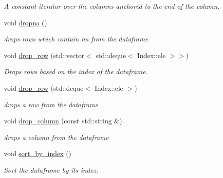 \begin{DoxyCompactItemize}
\begin{DoxyCompactList}\small\item\em A constant iterator over the columns anchored to the end of the column. \end{DoxyCompactList}\item 
void \hyperlink{classDataFrame_a6abc672ac4c439e3e785bd3f84c8da15}{dropna} ()
\begin{DoxyCompactList}\small\item\em drops rows which contain na from the dataframe \end{DoxyCompactList}\item 
void \hyperlink{classDataFrame_a4b4198c63e6ed421968303e872beb807}{drop\+\_\+row} (std\+::vector$<$ std\+::deque$<$ Index\+::ele $>$$>$)
\begin{DoxyCompactList}\small\item\em Drops rows based on the index of the dataframe. \end{DoxyCompactList}\item 
\mbox{\label{classDataFrame_a644965d62c039b88a940c2cb83a29fbc}} 
void \hyperlink{classDataFrame_a644965d62c039b88a940c2cb83a29fbc}{drop\+\_\+row} (std\+::deque$<$ Index\+::ele $>$)
\begin{DoxyCompactList}\small\item\em drops a row from the dataframe \end{DoxyCompactList}\item 
\mbox{\label{classDataFrame_afa6fd73a62f0d45b03e5df738a575693}} 
void \hyperlink{classDataFrame_afa6fd73a62f0d45b03e5df738a575693}{drop\+\_\+column} (const std\+::string \&)
\begin{DoxyCompactList}\small\item\em drops a column from the dataframe \end{DoxyCompactList}\item 
\mbox{\label{classDataFrame_ae9eb64b2d0c072459f85a4b840978060}} 
void \hyperlink{classDataFrame_ae9eb64b2d0c072459f85a4b840978060}{sort\+\_\+by\+\_\+index} ()
\begin{DoxyCompactList}\small\item\em Sort the dataframe by its index. \end{DoxyCompactList}\item 
\mbox{\label{classDataFrame_afd7ed39033d1ad707688df66b860ff1a}} 
$$
\end{DoxyCompactItemize}
